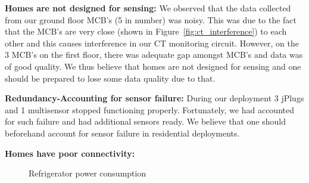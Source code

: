 \documentclass[10pt]{sensys-proc}
\newcommand{\figref}[1]{Figure~\ref{#1}}
\begin{document}
\noindent \textbf{Homes are not designed for sensing:} We observed that the data collected from our ground floor MCB's (5 in number) was noisy. This was due to the fact that the MCB's are very close (shown in \figref{fig:ct_interference}) to each other and this causes interference in our CT monitoring circuit. However, on the 3 MCB's on the first floor, there was adequate gap amongst MCB's and data was of good quality. We thus believe that homes are not designed for sensing and one should be prepared to lose some data quality due to that.

\noindent \textbf{Redundancy-Accounting for sensor failure:} During our deployment 3 jPlugs and 1 multisensor stopped functioning properly. Fortunately, we had accounted for such failure and had additional sensors ready. We believe that one should beforehand  account for sensor failure in residential deployments.

\noindent \textbf{Homes have poor connectivity:} 

\begin{figure}
       
   
    \caption{Refrigerator power consumption}

    \label{fig:metadata}

\end{figure}
\end{document}
